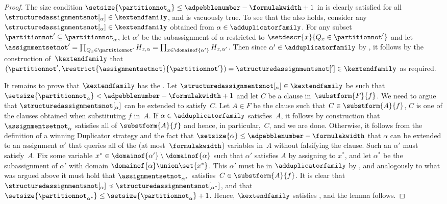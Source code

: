 \documentclass[11pt]{article}
\numberwithin{equation}{section}
\theoremstyle{definition}
\theoremstyle{plain}
\begin{document}
\begin{proof}
  The size condition
  $\setsize{\partitionnot_\alpha} \leq  \adpebblenumber - \formulakwidth + 1$ 
  in
  is clearly satisfied for all
  $\structuredassignmentsnot[_\alpha] \in \kextendfamily$, 
  and \respectfulness is vacuously true.
  To see that the \restrictionproperty{} also holds,
%
%
%
  consider any
  \mbox{$\structuredassignmentsnot[_\alpha] \in \kextendfamily$} 
  obtained from $\alpha \in \adduplicatorfamily$.
  For any subset 
  $\partitionnot' \subseteq \partitionnot_\alpha$, 
  let
  $\alpha'$
  be the subassignment of 
  $\alpha$
  restricted to 
  $\setdescr{x}{Q_x \in \partitionnot'}$
%
  and let
  $
  \assignmentsetnot' = 
  \prod_{Q_x \in \partitionnot'} H_{x,\alpha} =
  \prod_{x \in \domainof{\alpha'}} H_{x,\alpha'}
  $.
  Then since
  $\alpha' \in \adduplicatorfamily$
  by
 ,  
  it follows by the construction of~$\kextendfamily$
  that
  $
  (\partitionnot', \restrict{\assignmentsetnot}{\partitionnot'})
  =
  \structuredassignmentsnot[']
  \in
  \kextendfamily$
  as required.
%
%
%
%
%
%
%
%
%
%
%
%


  It 
%
  remains to prove that $\kextendfamily$ has the
  \extensionproperty{}. 
%
%
%
%
%
%
%
  Let $\structuredassignmentsnot[_\alpha] \in \kextendfamily$ be 
  such that
  $\setsize{\partitionnot_\alpha} < \adpebblenumber - \formulakwidth + 1$ 
  and
%
  let 
  $C$ be a clause in~$\substform{F}{f}$.
  We need to argue that 
  $\structuredassignmentsnot[_\alpha]$
  can be extended to satisfy~$C$.
%
  Let 
  $A \in F$
  be the clause such that
  $C \in \substform{A}{f}$,
  \ieComma $C$ is one of the clauses
  obtained when substituting
%
  $f$ in~$A$. 
  If
  $\alpha \in \adduplicatorfamily$ 
  satisfies~$A$, it follows by construction that 
  $\assignmentsetnot_\alpha$
  satisfies all of 
  $\substform{A}{f}$ 
  and hence, in particular,~$C$, and we are done.
  Otherwise, 
%
%
%
%
%
%
%
%
  it follows
  from the definition 
  of a winning Duplicator strategy and the
  fact that $\setsize{\alpha} \leq \adpebblenumber - \formulakwidth$
  that $\alpha$ can be extended to an assignment $\alpha'$
%
%
%
  that queries all of the (at most~$\formulakwidth$) variables in~$A$ 
  without falsifying the clause. Such an $\alpha'$ must satisfy~$A$.
  Fix some variable
  $x^* \in \domainof{\alpha'} \setminus \domainof{\alpha}$
  such that $\alpha'$ satisfies $A$ by assigning to $x^*$,
  and let
  $\alpha^*$ be the subassignment of $\alpha'$
  with domain
  $\domainof{\alpha} \union \set{x^*}$.
%
%
%
%
%
%
%
%
%
%
%
%
%
%
%
  This $\alpha'$ must be in $\adduplicatorfamily$ by
 ,  
  and analogously to what was argued above it must hold that
  $\assignmentsetnot_{\alpha^*}$
  satisfies~$C \in \substform{A}{f}$.
  It is clear that
  $\structuredassignmentsnot[_{\alpha}] 
  \preccurlyeq 
  \structuredassignmentsnot[_{\alpha^*}]$,
  and that
  $\setsize{\partitionnot_{\alpha^*}} \leq
  \setsize{\partitionnot_\alpha} + 1$.
  Hence, 
  $\kextendfamily$ satisfies
  \extensionpropname, and the lemma follows.
\end{proof}
\end{document}
